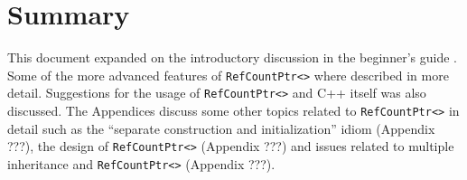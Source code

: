 %
\section{Summary}
%

This document expanded on the introductory discussion in the
beginner's guide {}\cite{ref:RefCountPtrBeginnersGuide}.  Some of the
more advanced features of {}\texttt{Ref\-Count\-Ptr<>} where described
in more detail.  Suggestions for the usage of
{}\texttt{Ref\-Count\-Ptr<>} and C++ itself was also discussed.  The
Appendices discuss some other topics related to
{}\texttt{Ref\-Count\-Ptr<>} in detail such as the ``separate
construction and initialization'' idiom (Appendix ???), the design of
{}\texttt{Ref\-Count\-Ptr<>} (Appendix ???) and issues related to
multiple inheritance and {}\texttt{Ref\-Count\-Ptr<>} (Appendix ???).
